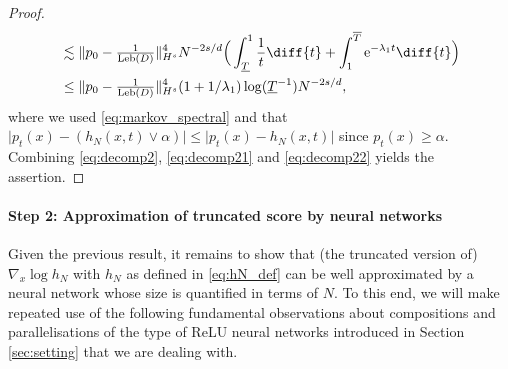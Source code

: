 \documentclass[a4paper, 11pt, headings = small, abstract]{scrartcl}
\begin{document}
\begin{proof}
\begin{equation}
\begin{split}
&\lesssim \lVert p_0 - \tfrac{1}{\operatorname{Leb}(D)} \rVert_{H^s}^4 N^{-2s/d}\Big( \int_{\underline{T}}^1 \frac{1}{t} \diff{t} + \int_1^{\overline{T}} \mathrm{e}^{-\lambda_1 t} \diff{t}\Big)\\ 
&\leq \lVert p_0 - \tfrac{1}{\operatorname{Leb}(D)} \rVert_{H^s}^4(1 + 1/\lambda_1) \log(\underline{T}^{-1}) N^{-2s/d},
\end{split}
\end{equation}
where we used \eqref{eq:markov_spectral} and that $\lvert p_t(x) - (h_N(x,t) \vee \alpha) \rvert \leq \lvert p_t(x) - h_N(x,t) \rvert$ since $p_t(x) \geq \alpha$. 
Combining \eqref{eq:decomp2}, \eqref{eq:decomp21} and \eqref{eq:decomp22} yields the assertion.
\end{proof}



\paragraph{Step 2: Approximation of truncated score by neural networks}
Given the previous result, it remains to show that (the truncated version of) $\nabla_x\log h_N$ with $h_N$ as defined in \eqref{eq:hN_def} can be well approximated by a neural network whose size is quantified in terms of $N$. 
To this end, we will make repeated use of the following fundamental observations about compositions and parallelisations of the type of ReLU neural networks introduced in Section \ref{sec:setting} that we are dealing with. 
\end{document}
